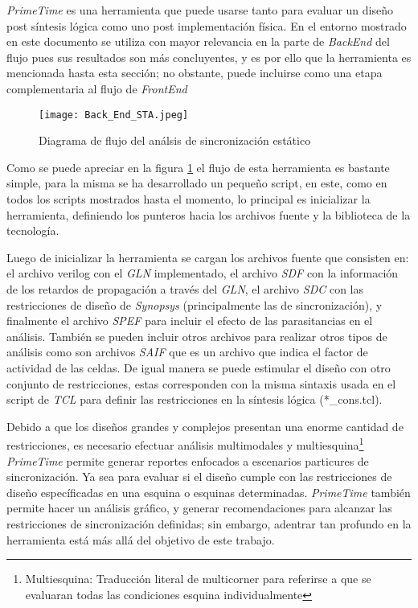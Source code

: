\textit{PrimeTime} es una herramienta que puede usarse tanto para evaluar un diseño post síntesis lógica como uno post implementación física. En el entorno mostrado en este documento se utiliza con mayor relevancia en la parte de \textit{BackEnd} del flujo pues sus resultados son más concluyentes, y es por ello que la herramienta es mencionada hasta esta sección; no obstante, puede incluirse como una etapa complementaria al flujo de \textit{FrontEnd}

\begin{figure}[ht]
\texttt{[image: Back\_End\_STA.jpeg]}
\caption{Diagrama de flujo del análsis de sincronización estático}
\label{fig:staflow}
\end{figure}

Como se puede apreciar en la figura \ref{fig:staflow} el flujo de esta herramienta es bastante simple, para la misma se ha desarrollado un pequeño script, en este, como en todos los scripts mostrados hasta el momento, lo principal es inicializar la herramienta, definiendo los punteros hacia los archivos fuente y la biblioteca de la tecnología.

Luego de inicializar la herramienta se cargan los archivos fuente que consisten en: el archivo verilog con el \textit{GLN} implementado, el archivo \textit{SDF} con la información de los retardos de propagación a través del \textit{GLN}, el archivo \textit{SDC} con las restricciones de diseño de \textit{Synopsys} (principalmente las de sincronización), y finalmente el archivo \textit{SPEF} para incluir el efecto de las parasitancias en el análisis. También se pueden incluir otros archivos para realizar otros tipos de análisis como son archivos \textit{SAIF} que es un archivo que indica el factor de actividad de las celdas. De igual manera se puede estimular el diseño con otro conjunto de restricciones, estas corresponden con la misma sintaxis usada en el script de \textit{TCL} para definir las restricciones en la síntesis lógica (*\_cons.tcl).

Debido a que los diseños grandes y complejos presentan una enorme cantidad de restricciones, es necesario efectuar análisis multimodales y multiesquina\footnote{Multiesquina: Traducción literal de multicorner para referirse a que se evaluaran todas las condiciones esquina individualmente} \textit{PrimeTime} permite generar reportes enfocados a escenarios particures de sincronización. Ya sea para evaluar si el diseño cumple con las restricciones de diseño específicadas en una esquina o esquinas determinadas. \textit{PrimeTime} también permite hacer un análisis gráfico, y generar recomendaciones para alcanzar las restricciones de sincronización definidas; sin embargo, adentrar tan profundo en la herramienta está más allá del objetivo de este trabajo.

